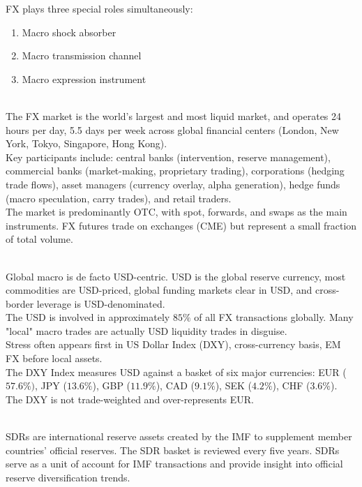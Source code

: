 FX plays three special roles simultaneously:
\begin{enumerate}[label=\roman*.]
\setlength{\itemsep}{0pt}
\item Macro shock absorber 
\item Macro transmission channel 
\item Macro expression instrument
\end{enumerate}

\begin{remark} \\
The FX market is the world's largest and most liquid market, and operates 24 hours per day, 5.5 days per week across global financial centers (London, New York, Tokyo, Singapore, Hong Kong).\\
Key participants include: central banks (intervention, reserve management), commercial banks (market-making, proprietary trading), corporations (hedging trade flows), asset managers (currency overlay, alpha generation), hedge funds (macro speculation, carry trades), and retail traders.\\
The market is predominantly OTC, with spot, forwards, and swaps as the main instruments. FX futures trade on exchanges (CME) but represent a small fraction of total volume.
\end{remark}

\begin{remark} \\
Global macro is de facto USD-centric. USD is the global reserve currency, most commodities are USD-priced, global funding markets clear in USD, and cross-border leverage is USD-denominated.\\
The USD is involved in approximately $85\%$ of all FX transactions globally. Many "local" macro trades are actually USD liquidity trades in disguise.\\
Stress often appears first in US Dollar Index (DXY), cross-currency basis, EM FX before local assets.\\
The DXY Index measures USD against a basket of six major currencies: EUR ($57.6\%)$, JPY ($13.6\%$), GBP ($11.9\%$), CAD ($9.1\%$), SEK ($4.2\%$), CHF ($3.6\%$). The DXY is not trade-weighted and over-represents EUR.
\end{remark}

\begin{remark} \\
SDRs are international reserve assets created by the IMF to supplement member countries' official reserves. The SDR basket is reviewed every five years. SDRs serve as a unit of account for IMF transactions and provide insight into official reserve diversification trends.
\end{remark}


